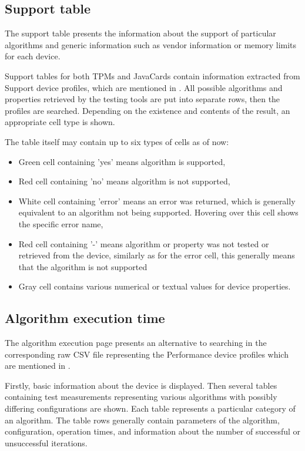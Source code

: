 \subsection{Support table}
The support table presents the information about the support of particular algorithms and generic information such as vendor information or memory limits for each device.

Support tables for both TPMs and JavaCards contain information extracted from Support device profiles, which are mentioned in . All possible algorithms and properties retrieved by the testing tools are put into separate rows, then the profiles are searched. Depending on the existence and contents of the result, an appropriate cell type is shown. 

The table itself may contain up to six types of cells as of now:
\begin{itemize}
    \item Green cell containing 'yes' means algorithm is supported,
    \item Red cell containing 'no' means algorithm is not supported,
    \item White cell containing 'error' means an error was returned, which is generally equivalent to an algorithm not being supported. Hovering over this cell shows the specific error name,
    \item Red cell containing '-' means algorithm or property was not tested or retrieved from the device, similarly as for the error cell, this generally means that the algorithm is not supported
    \item Gray cell contains various numerical or textual values for device properties.
\end{itemize}



\subsection{Algorithm execution time}
The algorithm execution page presents an alternative to searching in the corresponding raw CSV file representing the Performance device profiles which are mentioned in  . 

Firstly, basic information about the device is displayed. Then several tables containing test measurements representing various algorithms with possibly differing configurations are shown. Each table represents a particular category of an algorithm. The table rows generally contain parameters of the algorithm, configuration, operation times, and information about the number of successful or unsuccessful iterations.


